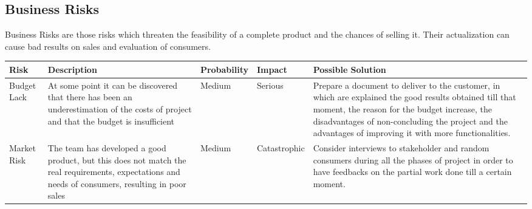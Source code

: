 \subsection{Business Risks}
Business Risks are those risks which threaten the feasibility of a complete product and the chances of selling it. Their actualization can cause bad results on sales and evaluation of consumers. \newline
\begin{adjustbox}{max width=\textwidth}
\begin{tabular}{|l|p{5 cm}|l|l|p{5 cm}|}
\hline
Risk & Description & Probability & Impact & Possible Solution
\\ \hline
Budget Lack & At some point it can be discovered that there has been an underestimation of the costs of project and that the budget is insufficient & Medium & Serious & Prepare a document to deliver to the customer, in which are explained the good results obtained till that moment, the reason for the budget increase, the disadvantages of non-concluding the project and the advantages of improving it with more functionalities.
\\ \hline
Market Risk & The team has developed a good product, but this does not match the real requirements, expectations and needs of consumers, resulting in poor sales & Medium & Catastrophic & Consider interviews to stakeholder and random consumers during all the phases of project in order to have feedbacks on the partial work done till a certain moment.
\\ \hline
\end{tabular}
\end{adjustbox}